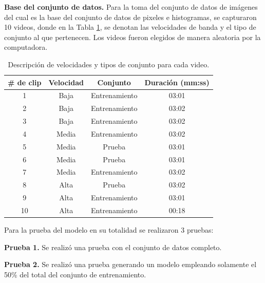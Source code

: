 \documentclass[twoside,spanish,ESP,MSc]{plantillaLabUPV}
\theoremstyle{definition}
\begin{document}
\checkmark\textbf{Base del conjunto de datos.}
Para la toma del conjunto de datos de imágenes del cual es la base del conjunto de datos de pixeles e histogramas, se capturaron 10 videos, donde en la Tabla \ref{clips}, se denotan las velocidades de banda y el tipo de conjunto al que pertenecen. Los videos fueron elegidos de manera aleatoria por la computadora.


\begin{table}[!tbh]
	\caption{Descripción de velocidades y tipos de conjunto para cada video.}
	\label{clips}
	\centering
	\begin{tabular}{|c|c|c|c|}
		\hline
		\textbf{\# de clip} & \textbf{Velocidad} & \textbf{Conjunto} & \textbf{Duración (mm:ss)} \\ \hline
		1                   & Baja               & Entrenamiento     & 03:01                     \\ \hline
		2                   & Baja               & Entrenamiento     & 03:02                     \\ \hline
		3                   & Baja               & Entrenamiento     & 03:02                     \\ \hline
		4                   & Media              & Entrenamiento     & 03:02                     \\ \hline
		5                   & Media              & Prueba            & 03:01                     \\ \hline
		6                   & Media              & Prueba            & 03:01                     \\ \hline
		7                   & Media              & Entrenamiento     & 03:02                     \\ \hline
		8                   & Alta               & Prueba            & 03:02                     \\ \hline
		9                   & Alta               & Entrenamiento     & 03:01                     \\ \hline
		10                  & Alta               & Entrenamiento     & 00:18                     \\ \hline
	\end{tabular}
\end{table}

Para la prueba del modelo en su totalidad se realizaron 3 pruebas:

\checkmark\textbf{Prueba 1.} Se realizó una prueba con el conjunto de datos completo.

\checkmark\textbf{Prueba 2.} Se realizó una prueba generando un modelo empleando solamente el 50\% del total del conjunto de entrenamiento.
\end{document}

